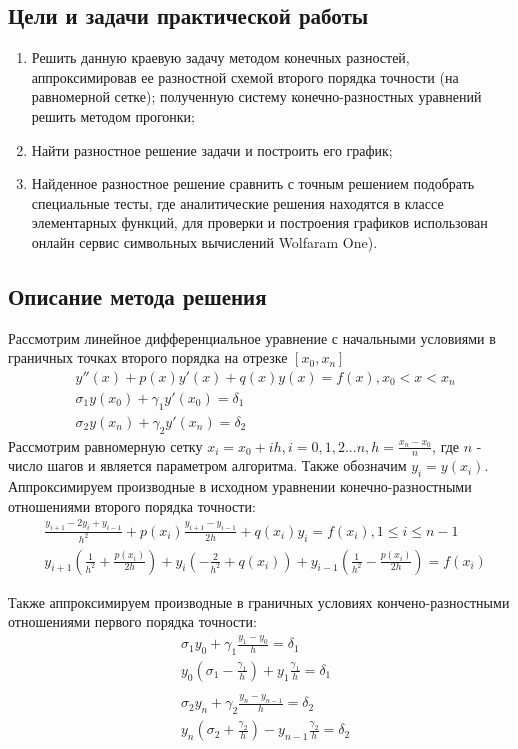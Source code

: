 \documentclass[a4paper,12pt,titlepage,finall]{article}
\begin{document}
\subsection{Цели и задачи практической работы}
\begin{enumerate}
\item
Решить данную краевую задачу методом конечных разностей, аппроксимировав ее разностной схемой второго порядка точности (на равномерной сетке); полученную систему конечно-разностных уравнений решить методом прогонки;
\item
Найти разностное решение задачи и построить его график;
\item
Найденное разностное решение сравнить с точным решением
подобрать специальные тесты, где
аналитические решения находятся в классе элементарных функций, для проверки и построения графиков использован онлайн сервис символьных вычислений Wolfaram One).
\end{enumerate}

\newpage
\subsection{Описание метода решения}
Рассмотрим линейное дифференциальное уравнение с начальными условиями в граничных точках второго порядка на отрезке $[x_0, x_n]$
\begin{align*}
&y''(x) + p(x) y'(x) + q(x) y(x) = f(x), x_0 < x < x_n \\
&\sigma_1 y(x_0) + \gamma_1 y'(x_0) = \delta_1\\
&\sigma_2 y(x_n) + \gamma_2 y'(x_n) = \delta_2
\end{align*}
Рассмотрим равномерную сетку $x_i = x_0 + ih, i = 0, 1, 2 ... n, h = \frac{x_n - x_0}{n}$, где $n$ - число шагов и является параметром алгоритма. Также обозначим $y_i = y(x_i)$. Аппроксимируем производные в исходном уравнении конечно-разностными отношениями второго порядка точности:
\begin{align*}
&\frac{y_{i+1} - 2y_i + y_{i-1}}{h^2} + p(x_i) \frac{y_{i+1} - y_{i-1}}{2h} + q(x_i) y_i = f(x_i), 1 \leq i \leq n - 1\\
&y_{i+1} \left( \frac{1}{h^2} + \frac{p(x_i)}{2h} \right) + y_i \left( -\frac{2}{h^2} + q(x_i) \right) + y_{i-1} \left( \frac{1}{h^2} - \frac{p(x_i)}{2h} \right) = f(x_i)
\end{align*}

Также аппроксимируем производные в граничных условиях кончено-разностными отношениями первого порядка точности:
\begin{align*}
&\sigma_1 y_0 + \gamma_1 \frac{y_1 - y_0}{h} = \delta_1\\
&y_0 \left( \sigma_1  - \frac{\gamma_1}{h} \right) + y_1 \frac{\gamma_1}{h} = \delta_1\\
&\\
&\sigma_2 y_n + \gamma_2 \frac{y_n - y_{n-1}}{h} = \delta_2\\
&y_n \left( \sigma_2  + \frac{\gamma_2}{h} \right) - y_{n-1} \frac{\gamma_2}{h} = \delta_2
\end{align*}
\end{document}
